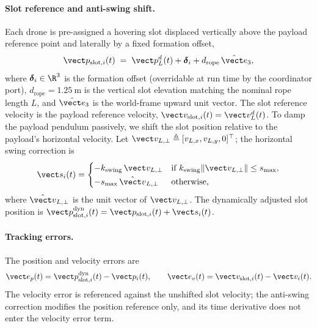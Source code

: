 \paragraph{Slot reference and anti-swing shift.} Each drone is pre-assigned a hovering slot displaced vertically above the payload reference point and laterally by a fixed formation offset,
\begin{equation}
  \vect p_{\mathrm{slot},i}(t)
    \;=\; \vect p_L^d(t) + \boldsymbol\delta_i
        + d_{\mathrm{rope}}\,\hat{\vect e}_3,
  \label{eq:slot-pos}
\end{equation}
where $\boldsymbol\delta_i \in \R^3$ is the formation offset (overridable at run time by the coordinator port), $d_{\mathrm{rope}} = \SI{1.25}{\metre}$ is the vertical slot elevation matching the nominal rope length $L$, and $\hat{\vect e}_3$ is the world-frame upward unit vector. The slot reference velocity is the payload reference velocity, $\vect v_{\mathrm{slot},i}(t) = \vect v_L^d(t)$. To damp the payload pendulum passively, we shift the slot position relative to the payload's horizontal velocity. Let $\vect v_{L,\perp} \triangleq [v_{L,x}, v_{L,y}, 0]^{\top}$; the horizontal swing correction is
\begin{equation}
  \vect s_i(t) =
    \begin{cases}
      -k_{\mathrm{swing}}\,\vect v_{L,\perp}
        & \text{if }
          k_{\mathrm{swing}}\|\vect v_{L,\perp}\| \le s_{\max}, \\[2pt]
      -s_{\max}\,\hat{\vect v}_{L,\perp}
        & \text{otherwise,}
    \end{cases}
  \label{eq:swing-shift}
\end{equation}
where $\hat{\vect v}_{L,\perp}$ is the unit vector of $\vect v_{L,\perp}$. The dynamically adjusted slot position is $\vect p_{\mathrm{slot},i}^{\mathrm{dyn}}(t)  = \vect p_{\mathrm{slot},i}(t) + \vect s_i(t)$.

\paragraph{Tracking errors.} The position and velocity errors are
\begin{equation}
  \vect e_p(t) = \vect p_{\mathrm{slot},i}^{\mathrm{dyn}}(t)
                 - \vect p_i(t),
  \qquad
  \vect e_v(t) = \vect v_{\mathrm{slot},i}(t) - \vect v_i(t).
  \label{eq:slot-error}
\end{equation}
The velocity error is referenced against the unshifted slot velocity; the anti-swing correction modifies the position reference only, and its time derivative does not enter the velocity error term.

